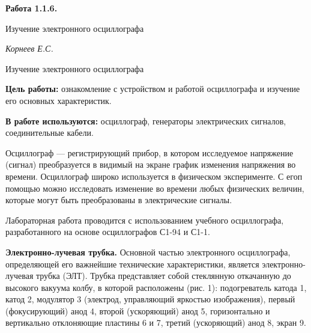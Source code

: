 \documentclass[14pt]{article}
\begin{document}
\begin{titlepage}
	\begin{center}
		\fontsize{18pt}{20pt}\selectfont
		\textbf{Работа 1.1.6.}	
	
		\vspace{5cm}
		\fontsize{24pt}{25pt}\selectfont
		Изучение электронного осциллографа
	\end{center}
	\begin{flushright}
		\fontsize{18pt}{20pt}\selectfont
		\vspace{14cm}
		\hspace{-3cm}
		\textit{Корнеев Е.С.}
	\end{flushright}		
\end{titlepage}

\newpage
\begin{center}
	\fontsize{16pt}{18pt}\selectfont	
	Изучение электронного осциллографа
\end{center}

\fontsize{14pt}{16pt}\selectfont
\vspace{1cm}
\textbf{Цель работы:} ознакомление с устройством и работой осциллографа и изучение его основных характеристик.

\vspace{0.5cm}
\textbf{В работе используются:} осциллограф, генераторы электрических сигналов, соединительные кабели.

\vspace{1cm}
Осциллограф --- регистрирующий прибор, в котором исследуемое напряжение (сигнал) преобразуется в видимый на экране график изменения напряжения во времени. Осциллограф широко используется в физическом эксперименте. С егоп помощью можно исследовать изменение во времени любых физических величин, которые могут быть преобразованы в электрические сигналы. 

Лабораторная работа проводится с использованием учебного осциллографа, разработанного на основе осциллографов С1-94 и С1-1. 

%
%

\vspace{0.5cm}
\textbf{Электронно-лучевая трубка.} Основной частью электронного осциллографа, определяющей его важнейшие технические характеристики, является электронно-лучевая трубка (ЭЛТ). Трубка представляет собой стеклянную откачанную до высокого вакуума колбу, в которой расположены (рис. 1): подогреватель катода 1, катод 2, модулятор 3 (электрод, управляющий яркостью изображения), первый (фокусирующий) анод 4, второй (ускоряющий) анод 5, горизонтально и вертикально отклоняющие пластины 6 и 7, третий (ускоряющий) анод 8, экран 9.
\end{document}

